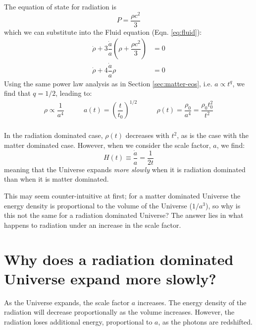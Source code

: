 \documentclass[11pt,a4paper]{book}
\begin{document}
The equation of state for radiation is
\begin{equation}
P = \dfrac{\rho c^2}{3}
\label{eq:rad-eos-1}
\end{equation}
which we can substitute into the Fluid equation
(Eqn. \eqref{eq:fluid}):
\begin{align}
    \dot{\rho} + 3\dfrac{\dot{a}}{a}\left(\rho + \dfrac{\rho c^2}{3}\right) &= 0\\
    \dot{\rho} + 4\dfrac{\dot{a}}{a}\rho &= 0
\label{eq:rad-eos-2}
\end{align}
Using the
same power law analysis as in
Section \ref{sec:matter-eos}, i.e. \(a \propto t^q\), we find that
\(q = 1/2\), leading to:
\begin{equation}
\begin{array}{lcr}
    \rho \propto \dfrac{1}{a^4} & \qquad a(t) = \left(\dfrac{t}{t_0}\right)^{1/2} & \qquad \rho(t) = \dfrac{\rho_0}{a^4} = \dfrac{\rho_0 t_0^2}{t^2}\\
\end{array}
\label{eq:rad-eos-3}    
\end{equation}

In the radiation dominated case, \(\rho(t)\) decreases with \(t^2\), as is
the case with the matter dominated case. However, when we consider the
scale factor, \(a\), we find:
\[H(t) \equiv \dfrac{\dot{a}}{a} = \dfrac{1}{2t}\] meaning that the
Universe expands \emph{more slowly} when it is radiation dominated than when
it is matter dominated.

This may seem counter-intuitive at first; for a matter dominated Universe
the energy density is proportional to the volume of the Universe
(\(1/a^3\)), so why is this not the same for a radiation dominated
Universe? The answer lies in what happens to radiation under an increase
in the scale factor.

\hypertarget{sec:slow_expansion_rad}{%
\section{Why does a radiation dominated Universe expand more slowly?}\label{sec:slow_expansion_rad}}

As the Universe expands, the scale factor \(a\) increases. The energy
density of the radiation will decrease proportionally as the volume
increases. However, the radiation loses additional energy, proportional
to \(a\), as the photons are redshifted.
\end{document}
